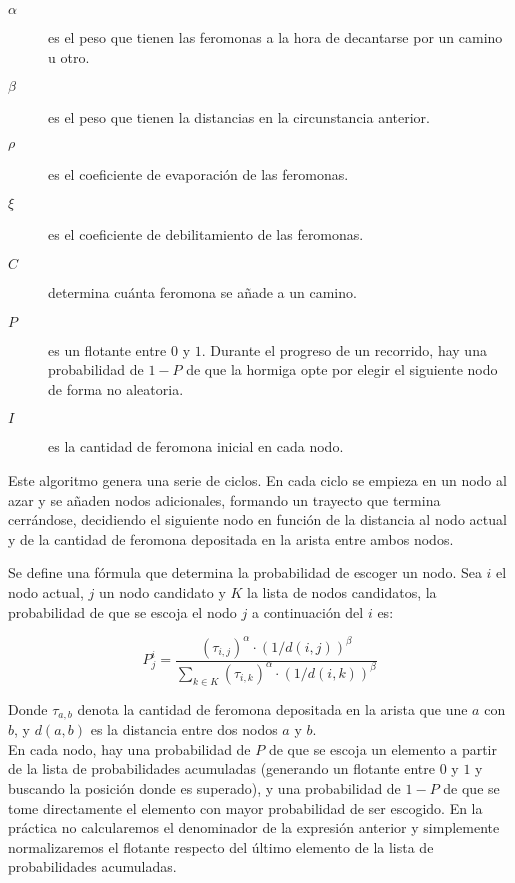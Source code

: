 \begin{description}
  \item[$\alpha$] es el peso que tienen las feromonas a la hora de decantarse por un camino u otro.
  \item[$\beta$] es el peso que tienen la distancias en la circunstancia anterior.
  \item[$\rho$] es el coeficiente de evaporación de las feromonas.
  \item[$\xi$] es el coeficiente de debilitamiento de las feromonas.
  \item[$C$] determina cuánta feromona se añade a un camino.
  \item[$P$] es un flotante entre $0$ y $1$. Durante el progreso de un recorrido, hay
  una probabilidad de $1-P$ de que la hormiga opte por elegir el siguiente nodo de forma no aleatoria.
  \item[$I$] es la cantidad de feromona inicial en cada nodo.
\end{description}

Este algoritmo genera una serie de ciclos. En cada ciclo se empieza en un nodo al azar y se añaden nodos adicionales, formando un trayecto que termina cerrándose, decidiendo el siguiente nodo en función de la distancia al nodo actual y de la cantidad de feromona depositada en la arista entre ambos nodos.

Se define una fórmula que determina la probabilidad de escoger un nodo. Sea $i$ el nodo actual, $j$ un nodo candidato y $K$ la lista de nodos candidatos, la probabilidad de que se escoja el nodo $j$ a continuación del $i$ es:

$$P_{j}^i = \frac{(\tau_{i,j})^\alpha \cdot (1/d(i,j))^\beta}{\displaystyle \sum_{k \in K} (\tau_{i,k})^\alpha \cdot (1/d(i,k))^\beta}$$

Donde $\tau_{a,b}$ denota la cantidad de feromona depositada en la arista que une $a$ con $b$, y $d(a,b)$ es la distancia entre dos nodos $a$ y $b$. \\

En cada nodo, hay una probabilidad de $P$ de que se escoja un elemento a partir de la lista de probabilidades acumuladas (generando un flotante entre $0$ y $1$ y buscando la posición donde es superado), y una probabilidad de $1-P$ de que se tome directamente el elemento con mayor probabilidad de ser escogido. En la práctica no calcularemos el denominador de la expresión anterior y simplemente normalizaremos el flotante respecto del último elemento de la lista de probabilidades acumuladas. \\


